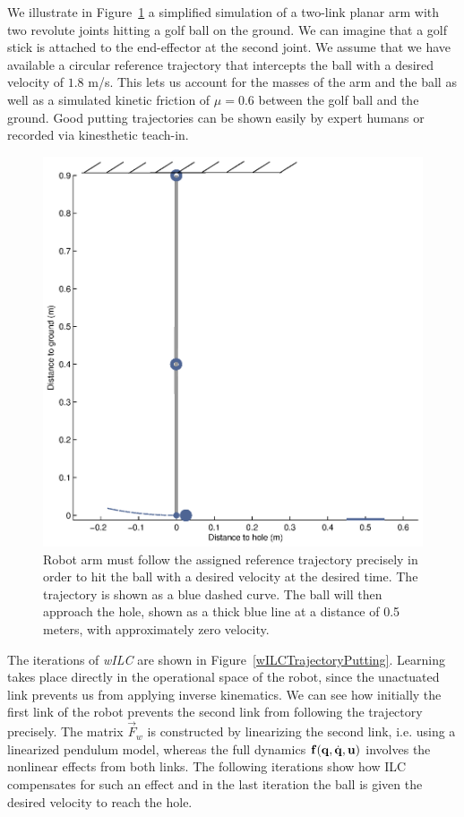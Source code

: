 We illustrate in Figure~\ref{putting1} a simplified simulation of a two-link planar arm with two revolute joints hitting a golf ball on the ground. We can imagine that a golf stick is attached to the end-effector at the second joint. We assume that we have available a circular reference trajectory that intercepts the ball with a desired velocity of $1.8$ m/s. This lets us account for the masses of the arm and the ball as well as a simulated kinetic friction of $\mu = 0.6$ between the golf ball and the ground. Good putting trajectories can be shown easily by expert humans or recorded via kinesthetic teach-in. 

\begin{figure} 
\centering 
% 
\includegraphics[scale=0.40]{putting1.eps}
\caption{Robot arm must follow the assigned reference trajectory precisely in order to hit the ball with a desired velocity at the desired time. The trajectory is shown as a blue dashed curve. The ball will then approach the hole, shown as a thick blue line at a distance of 0.5 meters, with approximately zero velocity.} 
\label{putting1} 
\end{figure} 

The iterations of \emph{wILC} are shown in Figure~\ref{wILCTrajectoryPutting}. Learning takes place directly in the operational space of the robot, since the unactuated link prevents us from applying inverse kinematics. We can see how initially the first link of the robot prevents the second link from following the trajectory precisely. The matrix $\vec{F}_{w}$ is constructed by linearizing the second link, i.e. using a linearized pendulum model, whereas the full dynamics $\boldsymbol{\mathrm{f}}(\boldsymbol{\mathrm{q}},\dot{\boldsymbol{\mathrm{q}}},\boldsymbol{\mathrm{u}})$ involves the nonlinear effects from both links. The following iterations show how ILC compensates for such an effect and in the last iteration the ball is given the desired velocity to reach the hole. 

